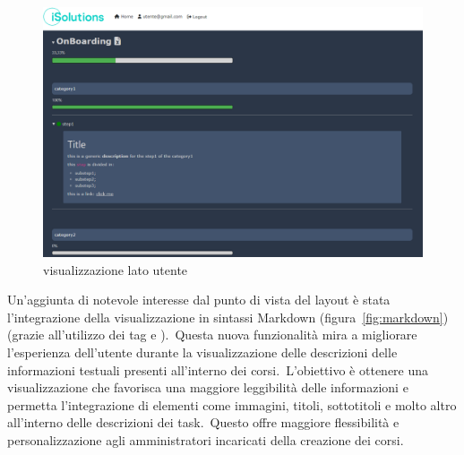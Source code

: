 \begin{figure}[H]
	\centering
	\includegraphics[width=0.9\linewidth]{img/UserView.png}
	\caption{visualizzazione lato utente}
	\label{fig:UserView}
\end{figure}

Un'aggiunta di notevole interesse dal punto di vista del layout è stata l'integrazione 
della visualizzazione in sintassi Markdown (figura~\ref{fig:markdown}) (grazie all'utilizzo dei tag  e ).\
Questa nuova funzionalità mira a migliorare 
l'esperienza dell'utente durante la visualizzazione delle descrizioni delle informazioni 
testuali presenti all'interno dei corsi.\ L'obiettivo è ottenere una visualizzazione che 
favorisca una maggiore leggibilità delle informazioni e permetta l'integrazione di 
elementi come immagini, titoli, sottotitoli e molto altro all'interno delle descrizioni 
dei task.\ Questo offre maggiore flessibilità e personalizzazione agli amministratori 
incaricati della creazione dei corsi.



